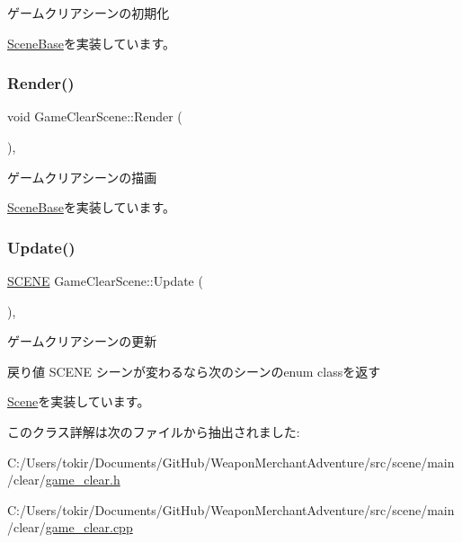 ゲームクリアシーンの初期化 



\mbox{\hyperlink{class_scene_base_a24d7db43c819924dc8b07b436f6d3148}{Scene\+Base}}を実装しています。

\mbox{\label{class_game_clear_scene_addea514045f47860cfa23439b7bba075}} 
\subsubsection{\texorpdfstring{Render()}{Render()}}
{\footnotesize\ttfamily void Game\+Clear\+Scene\+::\+Render (\begin{DoxyParamCaption}{ }\end{DoxyParamCaption})\hspace{0.3cm}{\ttfamily [final]}, {\ttfamily [virtual]}}



ゲームクリアシーンの描画 



\mbox{\hyperlink{class_scene_base_ad981674ce731ea267f398e889bbb9dc3}{Scene\+Base}}を実装しています。

\mbox{\label{class_game_clear_scene_aebea5913506cc86d9570b286e69dfedd}} 
\subsubsection{\texorpdfstring{Update()}{Update()}}
{\footnotesize\ttfamily \mbox{\hyperlink{scene__base_8h_a24cee5343fb9d0706ead6e8601f363be}{S\+C\+E\+NE}} Game\+Clear\+Scene\+::\+Update (\begin{DoxyParamCaption}{ }\end{DoxyParamCaption})\hspace{0.3cm}{\ttfamily [final]}, {\ttfamily [virtual]}}



ゲームクリアシーンの更新 

\begin{DoxyReturn}{戻り値}
S\+C\+E\+NE シーンが変わるなら次のシーンのenum classを返す 
\end{DoxyReturn}


\mbox{\hyperlink{class_scene_acb50f8104e5a7cfecbdececa7d5f1b39}{Scene}}を実装しています。



このクラス詳解は次のファイルから抽出されました\+:\begin{DoxyCompactItemize}
\item 
C\+:/\+Users/tokir/\+Documents/\+Git\+Hub/\+Weapon\+Merchant\+Adventure/src/scene/main/clear/\mbox{\hyperlink{game__clear_8h}{game\+\_\+clear.\+h}}\item 
C\+:/\+Users/tokir/\+Documents/\+Git\+Hub/\+Weapon\+Merchant\+Adventure/src/scene/main/clear/\mbox{\hyperlink{game__clear_8cpp}{game\+\_\+clear.\+cpp}}\end{DoxyCompactItemize}

